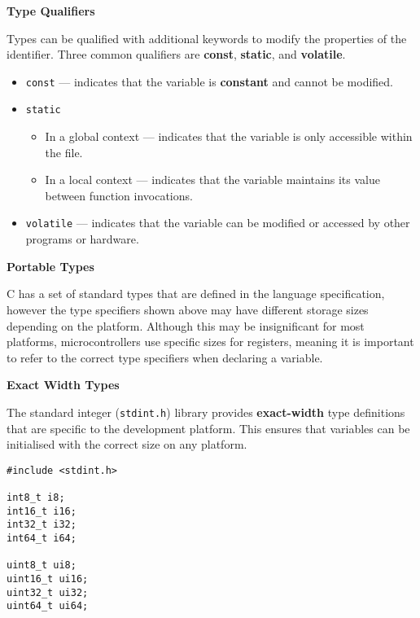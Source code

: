 \documentclass{article}
\begin{document}
\vspace{1em}
\textbf{Type Qualifiers}
\vspace{1em}

Types can be qualified with additional keywords to modify the
properties of the identifier. Three common qualifiers are
\textbf{const}, \textbf{static}, and \textbf{volatile}.
\begin{itemize}
    \item \texttt{const} --- indicates that the variable is \textbf{constant} and cannot be modified.
    \item \texttt{static}
          \begin{itemize}
              \item In a global context --- indicates that the variable
                    is only accessible within the file.
              \item In a local context --- indicates that the variable
                    maintains its value between function invocations.
          \end{itemize}
    \item \texttt{volatile} --- indicates that the variable can be modified or accessed by other programs or hardware.
\end{itemize}

\vspace{1em}
\textbf{Portable Types}
\vspace{1em}

C has a set of standard types that are defined in the language
specification, however the type specifiers shown above may have
different storage sizes depending on the platform. Although this may be
insignificant for most platforms, microcontrollers use specific sizes
for registers, meaning it is important to refer to the correct type
specifiers when declaring a variable.

\vspace{1em}
\textbf{Exact Width Types}\label{sec:exact_width_types}
\vspace{1em}

The standard integer (\texttt{stdint.h}) library provides
\textbf{exact-width} type definitions that are specific to the
development platform. This ensures that variables can be initialised
with the correct size on any platform.
\begin{verbatim}
#include <stdint.h>

int8_t i8;
int16_t i16;
int32_t i32;
int64_t i64;

uint8_t ui8;
uint16_t ui16;
uint32_t ui32;
uint64_t ui64;
\end{verbatim}
\end{document}
